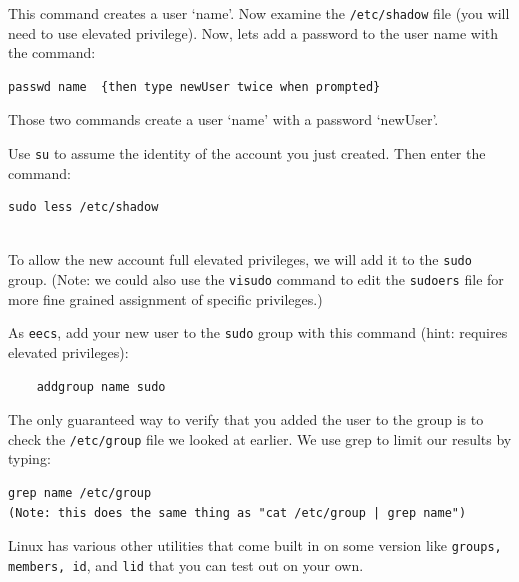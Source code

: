 \documentclass{article}
\begin{document}
This command creates a user `name'. Now examine the {\tt /etc/shadow} file (you will need to use elevated privilege). Now, lets add a password to the user name with the command:  \medskip

\begin{verbatim}
passwd name  {then type newUser twice when prompted}
\end{verbatim}

Those two commands create a user `name' with a password `newUser'. \medskip

\medskip

\medskip

Use {\tt su} to assume the identity of the account you just created. Then enter the command:

\begin{verbatim}
sudo less /etc/shadow
\end{verbatim}

\\

To allow the new account full elevated privileges, we will add it to the {\tt sudo} group. (Note: we could also use the {\tt visudo} command to edit the {\tt sudoers} file for more fine grained assignment of specific privileges.) 

As {\tt eecs}, add your new user to the {\tt sudo} group with this command (hint: requires elevated privileges):
\begin{verbatim}
	addgroup name sudo
\end{verbatim}

The only guaranteed way to verify that you added the user to the group is to check the {\tt /etc/group} file we looked at earlier. We use grep to limit our results by typing: 
\begin{verbatim}	
grep name /etc/group  
(Note: this does the same thing as "cat /etc/group | grep name")
\end{verbatim}

Linux has various other utilities that come built in on some version like {\tt groups, members, id}, and {\tt lid} that you can test out on your own. \medskip

\\
\end{document}
